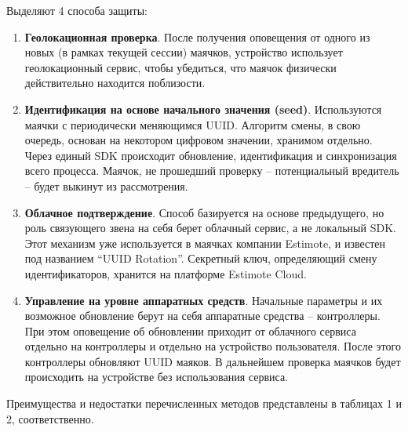 Выделяют 4 способа защиты:

\begin{enumerate}
    \item
    \textbf{Геолокационная проверка}. После получения оповещения от одного из новых (в рамках текущей сессии) маячков, устройство использует геолокационный сервис, чтобы убедиться, что маячок физически действительно находится поблизости.
    \item
    \textbf{Идентификация на основе начального значения (seed)}. Используются маячки с периодически меняющимся UUID. Алгоритм смены, в свою очередь, основан на некотором цифровом значении, хранимом отдельно. Через единый SDK происходит обновление, идентификация и синхронизация всего процесса. Маячок, не прошедший проверку – потенциальный вредитель – будет выкинут из рассмотрения.
    \item
    \textbf{Облачное подтверждение}. Способ базируется на основе предыдущего, но роль связующего звена на себя берет облачный сервис, а не локальный SDK. 
Этот механизм уже используется в маячках компании Estimote, и известен под названием “UUID Rotation”. Секретный ключ, определяющий смену идентификаторов, хранится на платформе Estimote Cloud.
    \item
    \textbf{Управление на уровне аппаратных средств}. Начальные параметры и их возможное обновление берут на себя аппаратные средства – контроллеры. При этом оповещение об обновлении приходит от облачного сервиса отдельно на контроллеры и отдельно на устройство пользователя. После этого контроллеры обновляют UUID маяков. В дальнейшем проверка маячков будет происходить на устройстве без использования сервиса.
\end{enumerate}

Преимущества и недостатки перечисленных методов представлены в таблицах 1 и 2, соответственно.

